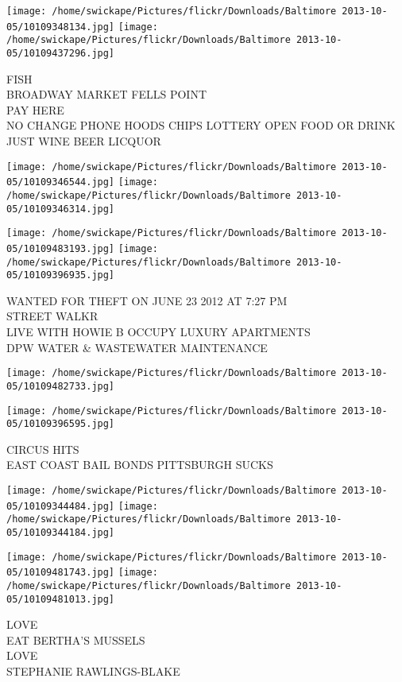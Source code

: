 \documentclass[10pt,letterpaper]{article}
\begin{document}
\texttt{[image: /home/swickape/Pictures/flickr/Downloads/Baltimore 2013-10-05/10109348134.jpg]}
\texttt{[image: /home/swickape/Pictures/flickr/Downloads/Baltimore 2013-10-05/10109437296.jpg]}

FISH\\
BROADWAY MARKET FELLS POINT\\
PAY HERE\\
NO CHANGE PHONE HOODS CHIPS LOTTERY OPEN FOOD OR DRINK JUST WINE BEER LICQUOR\\
\pagebreak

\texttt{[image: /home/swickape/Pictures/flickr/Downloads/Baltimore 2013-10-05/10109346544.jpg]}
\texttt{[image: /home/swickape/Pictures/flickr/Downloads/Baltimore 2013-10-05/10109346314.jpg]}

\texttt{[image: /home/swickape/Pictures/flickr/Downloads/Baltimore 2013-10-05/10109483193.jpg]}
\texttt{[image: /home/swickape/Pictures/flickr/Downloads/Baltimore 2013-10-05/10109396935.jpg]}

WANTED FOR THEFT ON JUNE 23 2012 AT 7:27 PM\\
STREET WALKR\\
LIVE WITH HOWIE B OCCUPY LUXURY APARTMENTS\\
DPW WATER \& WASTEWATER MAINTENANCE\\
\pagebreak

\texttt{[image: /home/swickape/Pictures/flickr/Downloads/Baltimore 2013-10-05/10109482733.jpg]}

\vspace{0.25in}
\texttt{[image: /home/swickape/Pictures/flickr/Downloads/Baltimore 2013-10-05/10109396595.jpg]}

CIRCUS HITS\\
EAST COAST BAIL BONDS PITTSBURGH SUCKS\\
\pagebreak

\texttt{[image: /home/swickape/Pictures/flickr/Downloads/Baltimore 2013-10-05/10109344484.jpg]}
\texttt{[image: /home/swickape/Pictures/flickr/Downloads/Baltimore 2013-10-05/10109344184.jpg]}

\texttt{[image: /home/swickape/Pictures/flickr/Downloads/Baltimore 2013-10-05/10109481743.jpg]}
\texttt{[image: /home/swickape/Pictures/flickr/Downloads/Baltimore 2013-10-05/10109481013.jpg]}

LOVE\\
EAT BERTHA'S MUSSELS\\
LOVE\\
STEPHANIE RAWLINGS{-}BLAKE\\
\pagebreak
\end{document}
